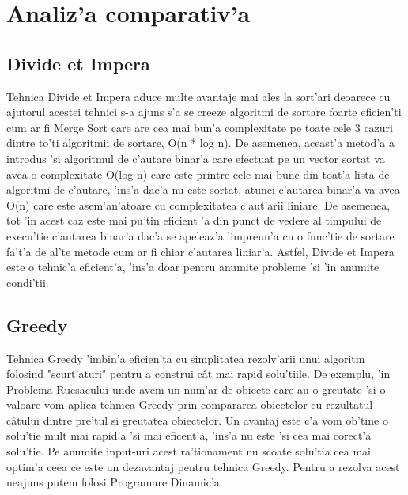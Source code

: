 \chapter{Analiz'a comparativ'a}
\section{Divide et Impera}
\myindent
Tehnica Divide et Impera aduce multe avantaje mai ales la sort'ari deoarece cu ajutorul acestei tehnici s-a ajuns s'a se creeze algoritmi de sortare foarte eficien'ti cum ar fi Merge Sort care are cea mai bun'a complexitate pe toate cele 3 cazuri dintre to'ti algoritmii de sortare, O(n * log n). De asemenea, aceast'a metod'a a introdus 'si algoritmul de c'autare binar'a care efectuat pe un vector sortat va avea o complexitate O(log n) care este printre cele mai bune din toat'a lista de algoritmi de c'autare, 'ins'a dac'a nu este sortat, atunci c'autarea binar'a va avea O(n) care este asem'an'atoare cu complexitatea c'aut'arii liniare. De asemenea, tot 'in acest caz este mai pu'tin eficient 'a din punct de vedere al timpului de execu'tie c'autarea binar'a dac'a se apeleaz'a 'impreun'a cu o func'tie de sortare fa't'a de al'te metode cum ar fi chiar c'autarea liniar'a. Astfel, Divide et Impera este o tehnic'a eficient'a, 'ins'a doar pentru anumite probleme 'si 'in anumite condi'tii.

\vspace{10mm}
\section{Greedy}
\myindent
Tehnica Greedy 'imbin'a eficien'ta cu simplitatea rezolv'arii unui algoritm folosind "scurt'aturi" pentru a construi c\^at mai rapid solu'tiile. De exemplu, 'in Problema Rucsacului unde avem un num'ar de obiecte care au o greutate 'si o valoare vom aplica tehnica Greedy prin compararea obiectelor cu rezultatul c\^atului dintre pre'tul si greutatea obiectelor. Un avantaj este c'a vom ob'tine o solu'tie mult mai rapid'a 'si mai eficent'a, 'ins'a nu este 'si cea mai corect'a solu'tie. Pe anumite input-uri acest ra'tionament nu scoate solu'tia cea mai optim'a ceea ce este un dezavantaj pentru tehnica Greedy. Pentru a rezolva acest neajuns putem folosi Programare Dinamic'a.

\vspace{10mm}
